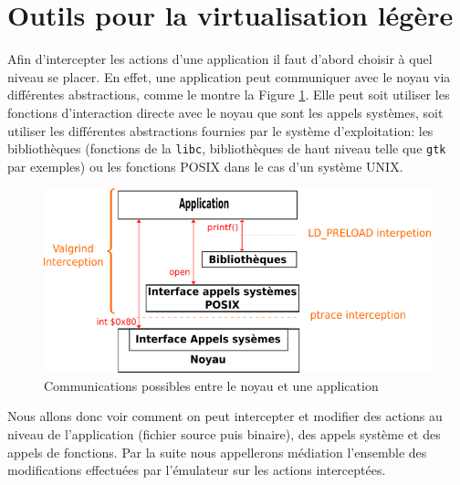 \section{Outils pour la virtualisation légère}
\label{section:tools}

Afin d'intercepter les actions d'une application il faut d'abord choisir à quel
niveau se placer.  En effet, une application peut communiquer avec le noyau via
différentes abstractions, comme le montre la Figure \ref{AS_Communication}. Elle
peut soit utiliser les fonctions d'interaction directe avec le noyau que sont
les appels systèmes, soit utiliser les différentes abstractions fournies par le
système d'exploitation: les bibliothèques (fonctions de la \texttt{libc},
bibliothèques de haut niveau telle que \texttt{gtk} par exemples) ou les
fonctions POSIX dans le cas d'un système UNIX.

\begin{figure}[H]
 \centering
 \includegraphics[scale=0.75]{Pictures/png/Communication_application_noyau_v3.png}
 \caption{Communications possibles entre le noyau et une application}
 \label{AS_Communication}
\end{figure}

Nous allons donc voir comment on peut intercepter et modifier des actions au
niveau de l'application (fichier source puis binaire), des appels système et
des appels de fonctions. Par la suite nous appellerons médiation l'ensemble des
modifications effectuées par l'émulateur sur les actions interceptées.

